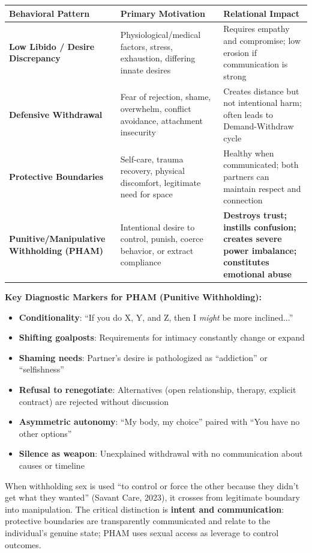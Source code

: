 \documentclass[12pt, letterpaper]{article}
\begin{document}
\begin{center}
\begin{tabular}{|p{2.2in}|p{1.8in}|p{2in}|}
\hline
\textbf{Behavioral Pattern} & \textbf{Primary Motivation} & \textbf{Relational Impact} \\
\hline
\textbf{Low Libido / Desire Discrepancy} & Physiological/medical factors, stress, exhaustion, differing innate desires & Requires empathy and compromise; low erosion if communication is strong \\
\hline
\textbf{Defensive Withdrawal} & Fear of rejection, shame, overwhelm, conflict avoidance, attachment insecurity & Creates distance but not intentional harm; often leads to Demand-Withdraw cycle \\
\hline
\textbf{Protective Boundaries} & Self-care, trauma recovery, physical discomfort, legitimate need for space & Healthy when communicated; both partners can maintain respect and connection \\
\hline
\textbf{Punitive/Manipulative Withholding (PHAM)} & Intentional desire to control, punish, coerce behavior, or extract compliance & \textbf{Destroys trust; instills confusion; creates severe power imbalance; constitutes emotional abuse} \\
\hline
\end{tabular}
\end{center}

\textbf{Key Diagnostic Markers for PHAM (Punitive Withholding):}

\begin{itemize}
    \item \textbf{Conditionality}: ``If you do X, Y, and Z, then I \textit{might} be more inclined...''
    \item \textbf{Shifting goalposts}: Requirements for intimacy constantly change or expand
    \item \textbf{Shaming needs}: Partner's desire is pathologized as ``addiction'' or ``selfishness''
    \item \textbf{Refusal to renegotiate}: Alternatives (open relationship, therapy, explicit contract) are rejected without discussion
    \item \textbf{Asymmetric autonomy}: ``My body, my choice'' paired with ``You have no other options''
    \item \textbf{Silence as weapon}: Unexplained withdrawal with no communication about causes or timeline
\end{itemize}

When withholding sex is used ``to control or force the other because they didn't get what they wanted'' (Savant Care, 2023), it crosses from legitimate boundary into manipulation. The critical distinction is \textbf{intent and communication}: protective boundaries are transparently communicated and relate to the individual's genuine state; PHAM uses sexual access as leverage to control outcomes.
\end{document}
